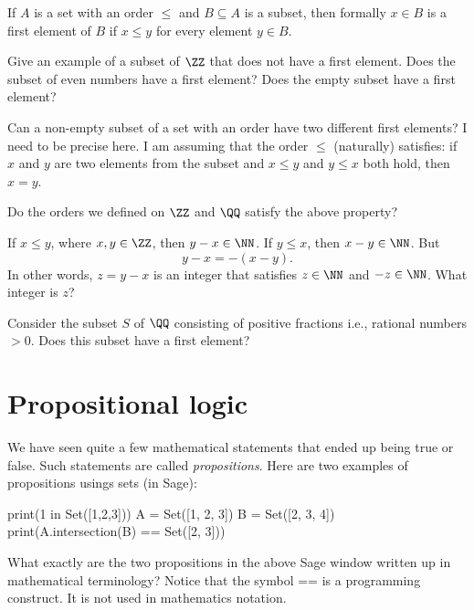 \documentclass{article}
\begin{document}
\begin{frameit}[emph]
If $A$ is a set with an order $\leq$ and $B\subseteq A$ is a subset, then formally $x\in B$ is a
first element of $B$ if $x \leq y$ for every element $y\in B$.
\end{frameit}

  



\beginshex
Give an example of a subset of $\ZZ$ that does not have a first element. Does the
subset of even numbers have a first element? Does the empty subset have a first element?
\endshex

\beginshex
Can a non-empty subset of a set with an order have two different first elements? I need to
be precise here. I am assuming that the order $\leq$ (naturally) satisfies: if
$x$ and $y$ are two elements from the subset and $x\leq y$ and $y \leq x$ both hold,
then $x = y$.

Do the orders we defined on $\ZZ$ and $\QQ$ satisfy the above property?

\begin{hint}[showhide]
  If $x \leq y$, where $x, y\in \ZZ$, then $y - x\in \NN$. If $y \leq x$, then $x - y\in \NN$.
  But
  $$
  y - x = - (x - y).
  $$
  In other words, $z = y - x$ is an integer that satisfies $z\in \NN$ and $-z\in \NN$.
  What integer is $z$?
\end{hint}
\endshex

\beginshex
Consider the subset $S$ of $\QQ$ consisting of positive fractions i.e., rational numbers  $>0$.
Does this subset have a first element?
\endshex




\section{Propositional logic}

We have seen quite a few mathematical statements that ended up 
being true or false. Such statements are called \emph{propositions}.
Here are two examples of propositions usings sets (in Sage):

\begin{sage}
print(1 in Set([1,2,3]))
A = Set([1, 2, 3])
B = Set([2, 3, 4])
print(A.intersection(B) == Set([2, 3])) 
\end{sage}

\beginshex
What exactly are the two propositions in the above Sage window written
up in mathematical terminology? Notice that the symbol == is
a programming construct. It is not used in mathematics notation.
\endshex
\end{document}
